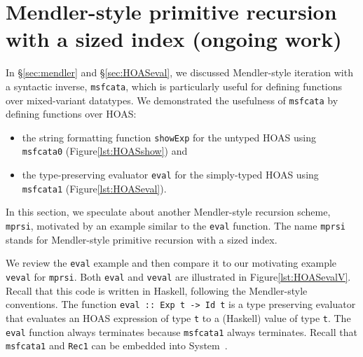 \section{Mendler-style primitive recursion with a sized index (ongoing work)}
\label{sec:mprsi}

In \S\ref{sec:mendler} and \S\ref{sec:HOASeval}, we discussed
Mendler-style iteration with a syntactic inverse, \lstinline{msfcata},
which is particularly useful for defining functions over
mixed-variant datatypes. We demonstrated the usefulness of
\lstinline{msfcata} by defining functions over HOAS:
\begin{itemize}
\item the string formatting function \lstinline{showExp} for
	the untyped HOAS using \lstinline{msfcata0}
	(Figure\;\ref{lst:HOASshow}) and
\item the type-preserving evaluator \lstinline{eval} for
	the simply-typed HOAS using \lstinline{msfcata1}
	(Figure\;\ref{lst:HOASeval}).
\end{itemize}

In this section, we speculate about another Mendler-style recursion scheme,
\lstinline{mprsi}, motivated by an example similar to the \lstinline{eval}
function. The name \lstinline{mprsi} stands for
Mendler-style primitive recursion with a sized index.

\begin{figure}

\vspace*{-3ex}
\end{figure}

We review the \lstinline{eval} example and then compare
it to our motivating example \lstinline{veval} for \lstinline{mprsi}.
Both \lstinline{eval} and \lstinline{veval} are illustrated
in Figure\;\ref{lst:HOASevalV}. Recall that this code is written in Haskell,
following the Mendler-style conventions.
The function \lstinline{eval :: Exp t -> Id t} is
a type preserving evaluator that evaluates an HOAS expression of type
\lstinline{t} to a (Haskell) value of type \lstinline{t}.
The \lstinline{eval} function always terminates because
\lstinline{msfcata1} always terminates. Recall that \lstinline{msfcata1}
and \lstinline{Rec1} can be embedded into System~\Fw.

